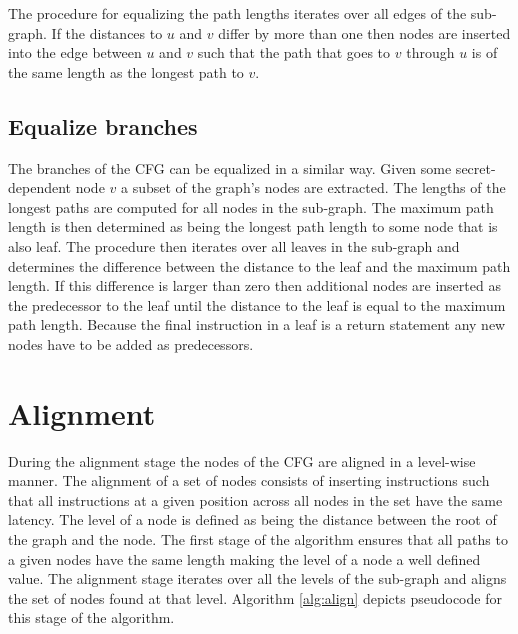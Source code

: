 The procedure for equalizing the path lengths iterates over all edges of the sub-graph. If the distances to $u$ and $v$ differ by more than one then nodes are inserted 
into the edge between $u$ and $v$ such that the path that goes to $v$ through $u$ is of the same length as the longest path to $v$. 

\subsection{Equalize branches}
The branches of the CFG can be equalized in a similar way. Given some secret-dependent node $v$ a subset of the graph's nodes are extracted. 
The lengths of the longest paths are computed for all nodes in the sub-graph. 
The maximum path length is then determined as being the longest path length to some node that is also leaf. 
The procedure then iterates over all leaves in the sub-graph and determines the difference between the distance to the leaf and the maximum path length. 
If this difference is larger than zero then additional nodes are inserted as the predecessor to the leaf until the distance to the leaf is equal to the maximum 
path length. Because the final instruction in a leaf is a return statement any new nodes have to be added as predecessors. 

\begin{figure}
 \centering

 \label{fig:problemStructures}
\end{figure}

\section{Alignment} \label{seq:alignment}

During the alignment stage the nodes of the CFG are aligned in a level-wise manner. 
The alignment of a set of nodes consists of inserting instructions such that all instructions at a given position across all nodes in the set have the same latency. 
The level of a node is defined as being the distance between the root of the graph and the node. The first stage of the algorithm ensures that all paths to a given nodes have the same length making the level of a node a well 
defined value. The alignment stage iterates over all the levels of the sub-graph and aligns the set of nodes found at that level. Algorithm \ref{alg:align} depicts pseudocode for this stage of the algorithm.

